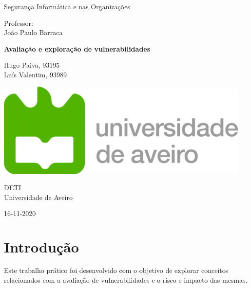 \documentclass[10pt,english]{article}
\begin{document}
\begin{titlepage}
	\clearpage\thispagestyle{empty}
	\centering
	\vspace{2cm}

	
	{\Large  Segurança Informática e nas Organizações \par}
	\vspace{0.5cm}
	{\small Professor: \\
	João Paulo Barraca\par}
	\vspace{4cm}
	{\Huge \textbf{Avaliação e exploração de vulnerabilidades}} \\
	\vspace{1cm}
	\vspace{4cm}
	{\normalsize Hugo Paiva, 93195 \\ 
	             Luís Valentim, 93989
	   \par}
	\vspace{2cm}

    \includegraphics[scale=0.20]{logo_ua.png}
    
    \vspace{2cm}
    
	{\normalsize DETI \\ 
		Universidade de Aveiro \par}
		
	{\normalsize 16-11-2020 \par}
	\vspace{2cm}
		
	
	\pagebreak

\end{titlepage}
\tableofcontents{}
\clearpage

\section{Introdução}
\par Este trabalho prático foi desenvolvido com o objetivo de explorar conceitos relacionados com a avaliação de vulnerabilidades e o risco e impacto das mesmas.
\end{document}
